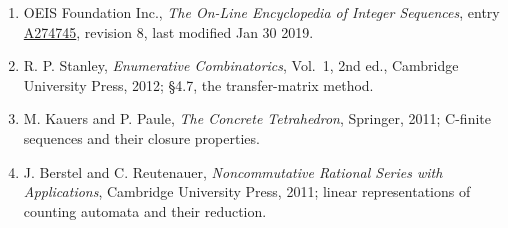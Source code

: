 \documentclass[11pt]{article}
\theoremstyle{definition}
\begin{document}
\begin{enumerate}

\item OEIS Foundation Inc., \emph{The On-Line Encyclopedia of Integer Sequences}, entry \href{https://oeis.org/A274745}{A274745}, revision 8, last modified Jan 30 2019.

\item R. P. Stanley, \emph{Enumerative Combinatorics}, Vol.~1, 2nd ed., Cambridge University Press, 2012; \S4.7, the transfer-matrix method.

\item M. Kauers and P. Paule, \emph{The Concrete Tetrahedron}, Springer, 2011; C-finite sequences and their closure properties.

\item J. Berstel and C. Reutenauer, \emph{Noncommutative Rational Series with Applications}, Cambridge University Press, 2011; linear representations of counting automata and their reduction.

\end{enumerate}
\end{document}
